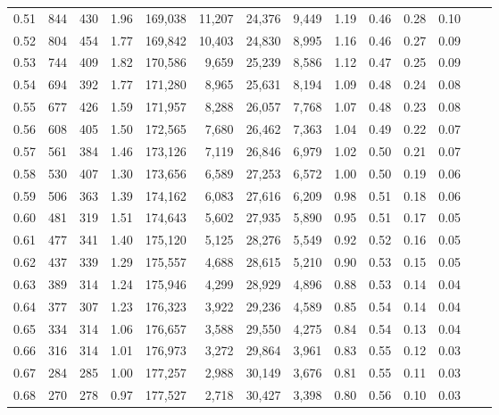 \begin{tabular}{rrrrrrrrrrrrrr}
0.51 &    844 &  430 &    1.96 &  169,038 &   11,207 &  24,376 &   9,449 &  1.19 &  0.46 &  0.28 &      0.10 \\
0.52 &    804 &  454 &    1.77 &  169,842 &   10,403 &  24,830 &   8,995 &  1.16 &  0.46 &  0.27 &      0.09 \\
0.53 &    744 &  409 &    1.82 &  170,586 &    9,659 &  25,239 &   8,586 &  1.12 &  0.47 &  0.25 &      0.09 \\
0.54 &    694 &  392 &    1.77 &  171,280 &    8,965 &  25,631 &   8,194 &  1.09 &  0.48 &  0.24 &      0.08 \\
0.55 &    677 &  426 &    1.59 &  171,957 &    8,288 &  26,057 &   7,768 &  1.07 &  0.48 &  0.23 &      0.08 \\
0.56 &    608 &  405 &    1.50 &  172,565 &    7,680 &  26,462 &   7,363 &  1.04 &  0.49 &  0.22 &      0.07 \\
0.57 &    561 &  384 &    1.46 &  173,126 &    7,119 &  26,846 &   6,979 &  1.02 &  0.50 &  0.21 &      0.07 \\
0.58 &    530 &  407 &    1.30 &  173,656 &    6,589 &  27,253 &   6,572 &  1.00 &  0.50 &  0.19 &      0.06 \\
0.59 &    506 &  363 &    1.39 &  174,162 &    6,083 &  27,616 &   6,209 &  0.98 &  0.51 &  0.18 &      0.06 \\
0.60 &    481 &  319 &    1.51 &  174,643 &    5,602 &  27,935 &   5,890 &  0.95 &  0.51 &  0.17 &      0.05 \\
0.61 &    477 &  341 &    1.40 &  175,120 &    5,125 &  28,276 &   5,549 &  0.92 &  0.52 &  0.16 &      0.05 \\
0.62 &    437 &  339 &    1.29 &  175,557 &    4,688 &  28,615 &   5,210 &  0.90 &  0.53 &  0.15 &      0.05 \\
0.63 &    389 &  314 &    1.24 &  175,946 &    4,299 &  28,929 &   4,896 &  0.88 &  0.53 &  0.14 &      0.04 \\
0.64 &    377 &  307 &    1.23 &  176,323 &    3,922 &  29,236 &   4,589 &  0.85 &  0.54 &  0.14 &      0.04 \\
0.65 &    334 &  314 &    1.06 &  176,657 &    3,588 &  29,550 &   4,275 &  0.84 &  0.54 &  0.13 &      0.04 \\
0.66 &    316 &  314 &    1.01 &  176,973 &    3,272 &  29,864 &   3,961 &  0.83 &  0.55 &  0.12 &      0.03 \\
0.67 &    284 &  285 &    1.00 &  177,257 &    2,988 &  30,149 &   3,676 &  0.81 &  0.55 &  0.11 &      0.03 \\
0.68 &    270 &  278 &    0.97 &  177,527 &    2,718 &  30,427 &   3,398 &  0.80 &  0.56 &  0.10 &      0.03 \\

\end{tabular}

